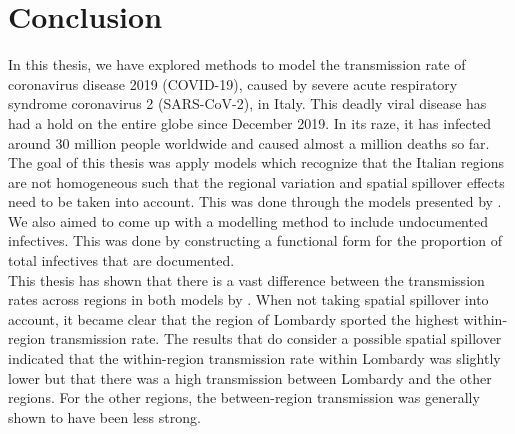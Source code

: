 \documentclass[12pt]{article}
\begin{document}
	\section{Conclusion} \label{sec:conclusion}
	
	In this thesis, we have explored methods to model the transmission rate of coronavirus disease 2019 (COVID-19), caused by severe acute respiratory syndrome coronavirus 2 (SARS-CoV-2), in Italy. This deadly viral disease has had a hold on the entire globe since December 2019. In its raze, it has infected around 30 million people worldwide and caused almost a million deaths so far. The goal of this thesis was apply models which recognize that the Italian regions are not homogeneous such that the regional variation and spatial spillover effects need to be taken into account. This was done through the models presented by \textcite{adda2016economic}. We also aimed to come up with a modelling method to include undocumented infectives. This was done by constructing a functional form for the proportion of total infectives that are documented. \\
	
	This thesis has shown that there is a vast difference between the transmission rates across regions in both models by \textcite{adda2016economic}. When not taking spatial spillover into account, it became clear that the region of Lombardy sported the highest within-region transmission rate. The results that do consider a possible spatial spillover indicated that the within-region transmission rate within Lombardy was slightly lower but that there was a high transmission between Lombardy and the other regions. For the other regions, the between-region transmission was generally shown to have been less strong. \\
	
\end{document}
